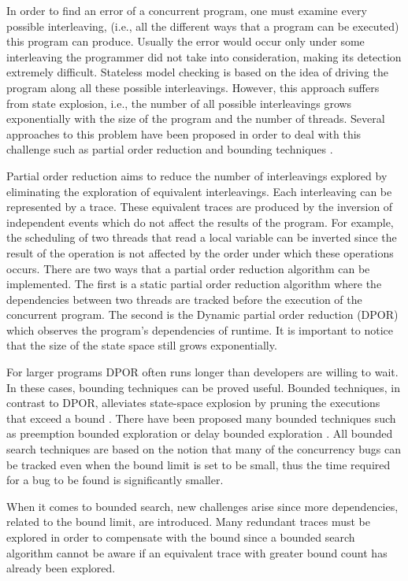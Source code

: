 In order to find an error of a concurrent program, one must examine every possible interleaving, (i.e., all the different ways that a program can be executed) this program can produce. Usually the error 
would occur only under some interleaving the programmer did not take into consideration, making its detection extremely difficult. Stateless model checking is based on the idea of driving 
the program along all these possible interleavings. However, this approach suffers from state explosion, i.e., the number of all possible interleavings grows 
exponentially with the size of the program and the number of threads. Several approaches to this problem have been proposed in order to deal with this challenge such as
partial order reduction \cite{Godefroid1996} and bounding techniques \cite{BPOR}. 

Partial order reduction aims to reduce the number of interleavings explored by eliminating the 
exploration of equivalent interleavings. Each interleaving can be represented by a trace.
These equivalent traces are produced by the inversion of independent events which do not affect the results of the program. For example, the scheduling of two threads that read a local
variable can be inverted since the result of the operation is not affected by the order under which these operations occurs. 
There are two ways that a partial order reduction algorithm can be implemented. The first is a
static partial order reduction algorithm \cite{Static1997} where the dependencies between two threads are tracked before the execution of the concurrent program. 
The second is the Dynamic partial order reduction (DPOR) \cite{FlanaganDPOR} which observes the program's dependencies of runtime. It is important to notice that the size of
the state space still grows exponentially. 

For larger programs DPOR often runs longer than developers are willing to wait. In these cases, bounding techniques can be proved useful. Bounded techniques,
in contrast to DPOR, alleviates state-space explosion by pruning the executions that exceed a bound \cite{Thomson}. There have been proposed many bounded techniques
such as preemption bounded exploration \cite{BPOR} or delay bounded exploration \cite{Delay11}. All bounded search techniques are based on the notion that many of the concurrency bugs can be
tracked even when the bound limit is set to be small, thus the time required for a bug to be found is significantly smaller.

When it comes to bounded search, new challenges arise \cite{BPOR} since more dependencies, related to the bound limit, are introduced. 
Many redundant traces must be explored in order to compensate with the bound since a bounded search algorithm cannot be aware if an equivalent trace with greater bound count
has already been explored.

